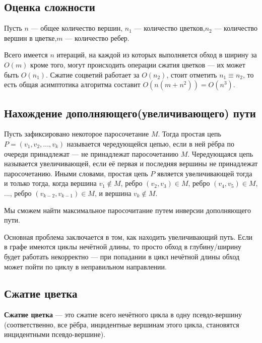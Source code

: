 \documentclass[14pt, a4paper]{extarticle}
\begin{document}
    \subsection*{Оценка сложности}
    
    Пусть $n$ --- общее количество вершин, $n_1$ --- количество цветков,$n_2$ --- количество вершин в цветке,$m$ --- количество ребер. 

    Всего имеется $n$ итераций, на каждой из которых выполняется обход в ширину за $O(m)$ кроме того, могут происходить операции сжатия цветков — их может быть $O(n_1)$. Сжатие соцветий работает за $O(n_2)$, стоит отметить $n_1 \equiv n_2$, то есть общая асимптотика алгоритма составит $O(n(m+n^2))=O(n^3)$.

    \subsection*{Нахождение дополняющего(увеличивающего) пути}

    Пусть зафиксировано некоторое паросочетание $M$. Тогда простая цепь $P = (v_1, v_2, \ldots, v_k)$ называется чередующейся цепью, если в ней рёбра по очереди принадлежат --- не принадлежат паросочетанию $M$. Чередующаяся цепь называется увеличивающей, если её первая и последняя вершины не принадлежат паросочетанию. Иными словами, простая цепь $P$ является увеличивающей тогда и только тогда, когда вершина $v_1 \not\in M$, ребро $(v_2,v_3) \in M$, ребро $(v_4,v_5) \in M$, ..., ребро $(v_{k-2},v_{k-1}) \in M$, и вершина $v_k \not\in M$.

    Мы сможем найти максимальное паросочитание путем инверсии дополняющего пути.

    Основная проблема заключается в том, как находить увеличивающий путь. Если в графе имеются циклы нечётной длины, то просто обход в глубину/ширину будет работать некорректно --- при попадании в цикл нечётной длины обход может пойти по циклу в неправильном направлении.

    \pagebreak

    \subsection*{Сжатие цветка}

    \textbf{Сжатие цветка} — это сжатие всего нечётного цикла в одну псевдо-вершину (соответственно, все рёбра, инцидентные вершинам этого цикла, становятся инцидентными псевдо-вершине).
    
\end{document}
